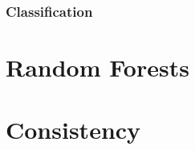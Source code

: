 

\subsubsection{Classification}






\section{Random Forests}
\label{sec:4:random-forests}








\section{Consistency}
\label{sec:4:consistency}

